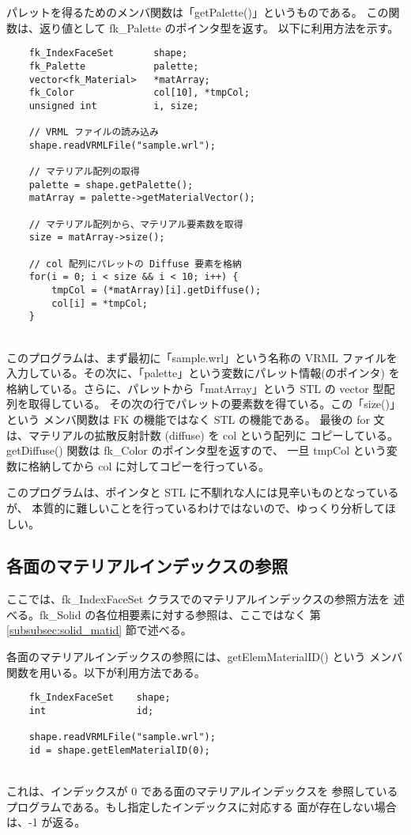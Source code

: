 パレットを得るためのメンバ関数は「getPalette()」というものである。
この関数は、返り値として fk\_Palette のポインタ型を返す。
以下に利用方法を示す。
\\
\begin{breakbox}
\begin{verbatim}
    fk_IndexFaceSet       shape;
    fk_Palette            palette;
    vector<fk_Material>   *matArray;
    fk_Color              col[10], *tmpCol;
    unsigned int          i, size;

    // VRML ファイルの読み込み
    shape.readVRMLFile("sample.wrl");

    // マテリアル配列の取得
    palette = shape.getPalette();
    matArray = palette->getMaterialVector();

    // マテリアル配列から、マテリアル要素数を取得
    size = matArray->size();

    // col 配列にパレットの Diffuse 要素を格納
    for(i = 0; i < size && i < 10; i++) {
        tmpCol = (*matArray)[i].getDiffuse();
        col[i] = *tmpCol;
    }
\end{verbatim}
\end{breakbox}
~ \\
このプログラムは、まず最初に「sample.wrl」という名称の VRML ファイルを
入力している。その次に、「palette」という変数にパレット情報(のポインタ)
を格納している。さらに、パレットから「matArray」という STL の
vector 型配列を取得している。
その次の行でパレットの要素数を得ている。この「size()」という
メンバ関数は FK の機能ではなく STL の機能である。
最後の for 文は、マテリアルの拡散反射計数 (diffuse) を col という配列に
コピーしている。getDiffuse() 関数は fk\_Color のポインタ型を返すので、
一旦 tmpCol という変数に格納してから col に対してコピーを行っている。

このプログラムは、ポインタと STL に不馴れな人には見辛いものとなっているが、
本質的に難しいことを行っているわけではないので、ゆっくり分析してほしい。

\subsection{各面のマテリアルインデックスの参照}
ここでは、fk\_IndexFaceSet クラスでのマテリアルインデックスの参照方法を
述べる。fk\_Solid の各位相要素に対する参照は、ここではなく
第 \ref{subsubsec:solid_matid} 節で述べる。

各面のマテリアルインデックスの参照には、getElemMaterialID() という
メンバ関数を用いる。以下が利用方法である。
\\
\begin{breakbox}
\begin{verbatim}
    fk_IndexFaceSet    shape;
    int                id;

    shape.readVRMLFile("sample.wrl");
    id = shape.getElemMaterialID(0);
\end{verbatim}
\end{breakbox}
~ \\
これは、インデックスが 0 である面のマテリアルインデックスを
参照しているプログラムである。もし指定したインデックスに対応する
面が存在しない場合は、-1 が返る。

